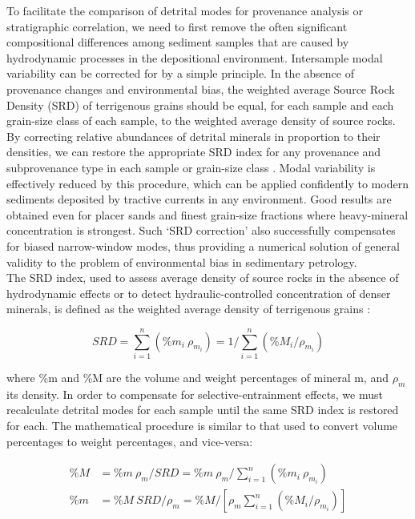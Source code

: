 \documentclass{article}
\begin{document}
To facilitate the comparison of detrital modes for provenance analysis
or stratigraphic correlation, we need to first remove the often
significant compositional differences among sediment samples that are
caused by hydrodynamic processes in the depositional
environment. Intersample modal variability can be corrected for by a
simple principle. In the absence of provenance changes and
environmental bias, the weighted average Source Rock Density (SRD) of
terrigenous grains should be equal, for each sample and each
grain-size class of each sample, to the weighted average density of
source rocks. By correcting relative abundances of detrital minerals
in proportion to their densities, we can restore the appropriate SRD
index for any provenance and subprovenance type in each sample or
grain-size class \citep{garzanti2009}. Modal variability is
effectively reduced by this procedure, which can be applied
confidently to modern sediments deposited by tractive currents in any
environment. Good results are obtained even for placer sands and
finest grain-size fractions where heavy-mineral concentration is
strongest. Such `SRD correction' also successfully compensates for
biased narrow-window modes, thus providing a numerical solution of
general validity to the problem of environmental bias in sedimentary
petrology.\\

The SRD index, used to assess average density of source rocks in the
absence of hydrodynamic effects or to detect hydraulic-controlled
concentration of denser minerals, is defined as the weighted average
density of terrigenous grains \citep[spurious and intrabasinal
  particles such as bioclasts are neglected in the
  calculation;][]{garzanti2007}:

\begin{equation}
SRD = \sum_{i=1}^n (\%m_i ~ \rho_{m_i}) = 1 / \sum_{i=1}^{n} (\%M_i / \rho_{m_i})
\label{eq:SRD}
\end{equation}

where \%m and \%M are the volume and weight percentages of mineral m,
and $\rho_m$ its density.  In order to compensate for
selective-entrainment effects, we must recalculate detrital modes for
each sample until the same SRD index is restored for each. The
mathematical procedure is similar to that used to convert volume
percentages to weight percentages, and vice-versa:

\begin{align}
\%M & = \%m ~ \rho_m / SRD = \%m ~ \rho_m / \sum_{i=1}^{n} (\%m_i ~ \rho_{m_i})  \label{eq:pctMu}\\
\%m & = \%M ~ SRD / \rho_m = \%M / \left[ \rho_m \sum_{i=1}^{n} (\%M_i / \rho_{m_i}) \right] \label{eq:pctml}
\end{align}
\end{document}
